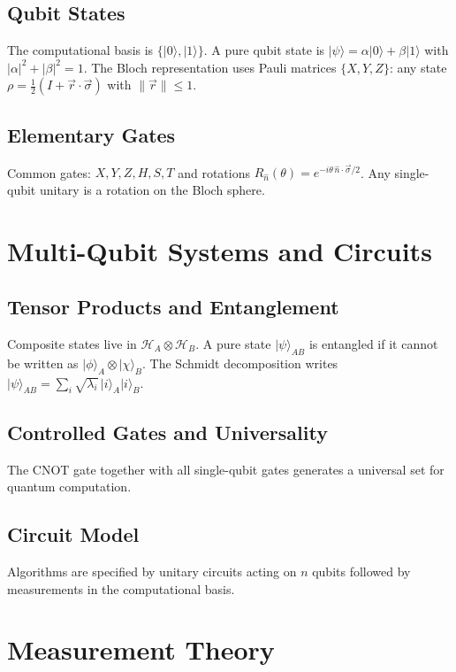 \documentclass[11pt]{article}
\theoremstyle{definition}
\newcommand{\ket}[1]{\lvert #1 \rangle}
\begin{document}
\subsection{Qubit States}
The computational basis is $\{\ket{0},\ket{1}\}$. A pure qubit state is $\ket{\psi}=\alpha\ket{0}+\beta\ket{1}$ with $|\alpha|^2+|\beta|^2=1$. The Bloch representation uses Pauli matrices $\{X,Y,Z\}$: any state $\rho=\tfrac{1}{2}(I+\vec{r}\cdot\vec{\sigma})$ with $\lVert\vec{r}\rVert\le 1$.

\subsection{Elementary Gates}
Common gates: $X, Y, Z, H, S, T$ and rotations $R_{\hat{n}}(\theta)=e^{-i\theta\,\hat{n}\cdot\vec{\sigma}/2}$. Any single-qubit unitary is a rotation on the Bloch sphere.

\section{Multi-Qubit Systems and Circuits}

\subsection{Tensor Products and Entanglement}
Composite states live in $\mathcal{H}_A\otimes\mathcal{H}_B$. A pure state $\ket{\psi}_{AB}$ is entangled if it cannot be written as $\ket{\phi}_A\otimes\ket{\chi}_B$. The Schmidt decomposition writes $\ket{\psi}_{AB}=\sum_i \sqrt{\lambda_i}\,\ket{i}_A\ket{i}_B$.

\subsection{Controlled Gates and Universality}
The CNOT gate together with all single-qubit gates generates a universal set for quantum computation.

\subsection{Circuit Model}
Algorithms are specified by unitary circuits acting on $n$ qubits followed by measurements in the computational basis.

\section{Measurement Theory}
\end{document}
